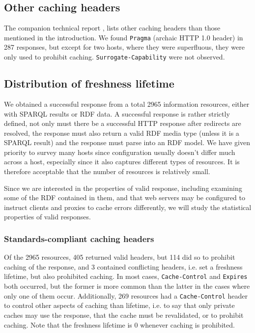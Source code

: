 \documentclass{llncs}
\newcommand{\httph}[1]{\texttt{#1}}
\begin{document}
\subsection{Other caching headers}

The companion technical report \cite{kjernsmo_add_survey_2015}, lists other caching
headers than those mentioned in the introduction. We found
\httph{Pragma} (archaic HTTP 1.0 header) in 287 responses, but except
for two hosts, where they were superfluous, they were only used to
prohibit caching. \httph{Surrogate-Capability} were not observed.

\subsection{Distribution of freshness lifetime}

We obtained a successful response from a total 2965 information
resources, either with SPARQL results or RDF data. A successful
response is rather strictly defined, not only must there be a
successful HTTP response after redirects are resolved, the response
must also return a valid RDF media type (unless it is a SPARQL result)
and the response must parse into an RDF model. We have given priority
to survey many hosts since configuration usually doesn't differ much
across a host, especially since it also captures different types of
resources. It is therefore acceptable that the number of resources is
relatively small.


Since we are interested in the properties of valid response, including
examining some of the RDF contained in them, and that web servers may
be configured to instruct clients and proxies to cache errors
differently, we will study the statistical properties of valid
responses.

\subsubsection{Standards-compliant caching headers}

Of the 2965 resources, 405 returned valid headers, but 114 did so to
prohibit caching of the response, and 3 contained conflicting
headers, i.e. set a freshness lifetime, but also prohibited
caching. In most cases, \httph{Cache-Control} and \httph{Expires} both
occurred, but the former is more common than the latter in the cases
where only one of them occur.  Additionally, 269 resources had a
\httph{Cache-Control} header to control other aspects of caching than
lifetime, i.e. to say that only private caches may use the response,
that the cache must be revalidated, or to prohibit caching. 
Note that the freshness lifetime is 0 whenever caching is prohibited.
\end{document}
